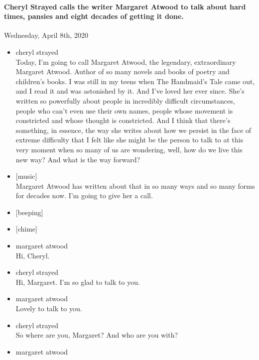 \hypertarget{cheryl-strayed-calls-the-writer-margaret-atwood-to-talk-about-hard-times-pansies-and-eight-decades-of-getting-it-done-2}{%
\paragraph{Cheryl Strayed calls the writer Margaret Atwood to talk about
hard times, pansies and eight decades of getting it
done.}\label{cheryl-strayed-calls-the-writer-margaret-atwood-to-talk-about-hard-times-pansies-and-eight-decades-of-getting-it-done-2}}

Wednesday, April 8th, 2020

\begin{itemize}
\item
  cheryl strayed\\
  Today, I'm going to call Margaret Atwood, the legendary, extraordinary
  Margaret Atwood. Author of so many novels and books of poetry and
  children's books. I was still in my teens when The Handmaid's Tale
  came out, and I read it and was astonished by it. And I've loved her
  ever since. She's written so powerfully about people in incredibly
  difficult circumstances, people who can't even use their own names,
  people whose movement is constricted and whose thought is constricted.
  And I think that there's something, in essence, the way she writes
  about how we persist in the face of extreme difficulty that I felt
  like she might be the person to talk to at this very moment when so
  many of us are wondering, well, how do we live this new way? And what
  is the way forward?
\item
  {[}music{]}\\
  Margaret Atwood has written about that in so many ways and so many
  forms for decades now. I'm going to give her a call.
\item
  {[}beeping{]}
\item
  {[}chime{]}
\item
  margaret atwood\\
  Hi, Cheryl.
\item
  cheryl strayed\\
  Hi, Margaret. I'm so glad to talk to you.
\item
  margaret atwood\\
  Lovely to talk to you.
\item
  cheryl strayed\\
  So where are you, Margaret? And who are you with?
\item
  margaret atwood\\

\end{itemize}
